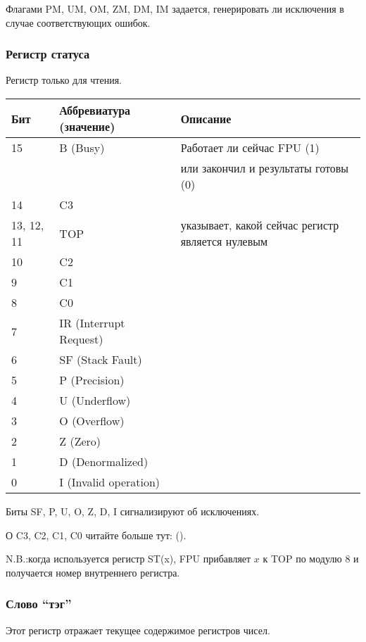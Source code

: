 Флагами PM, UM, OM, ZM, DM, IM 
задается, генерировать ли исключения в случае соответствующих ошибок.

\subsubsection{Регистр статуса}

\label{FPU_status_word}
Регистр только для чтения.

\small
\begin{center}
\begin{tabular}{ | l | l | l | }
\hline
Бит &
Аббревиатура (значение) &
Описание \\
\hline
15   & B (Busy) & Работает ли сейчас FPU (1) \\
     &          & или закончил и результаты готовы (0) \\
\hline
14   & C3 & \\
\hline
13, 12, 11 & TOP & указывает, какой сейчас регистр является нулевым \\
\hline
10 & C2 & \\
\hline
9  & C1 & \\
\hline
8  & C0 & \\
\hline
7  & IR (Interrupt Request) & \\
\hline
6  & SF (Stack Fault) & \\
\hline
5  & P (Precision) & \\
\hline
4  & U (Underflow) & \\
\hline
3  & O (Overflow) & \\
\hline
2  & Z (Zero) & \\
\hline
1  & D (Denormalized) & \\
\hline
0  & I (Invalid operation) & \\
\hline
\end{tabular}
\end{center}
\normalsize

Биты SF, P, U, O, Z, D, I сигнализируют об исключениях.

О C3, C2, C1, C0 читайте больше тут: ().

N.B.:когда используется регистр ST(x), FPU прибавляет $x$ к TOP по модулю 8 и получается номер
внутреннего регистра.

\subsubsection{Слово ``тэг''}

Этот регистр отражает текущее содержимое регистров чисел.

